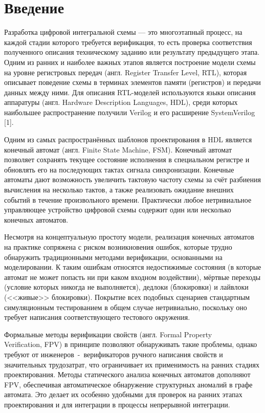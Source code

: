 \section{Введение}
\label{sec:Chapter0} 


Разработка цифровой интегральной схемы --- это многоэтапный процесс, на каждой стадии
которого требуется верификация, то есть проверка соответствия полученного описания техническому
заданию или результату предыдущего этапа. Одним из ранних и наиболее важных этапов является
построение модели схемы на уровне регистровых передач (англ. Register Transfer Level, RTL),
которая описывает поведение схемы в терминах элементов памяти (регистров) и передачи данных между ними.
Для описания RTL-моделей используются языки описания аппаратуры
(англ. Hardware Description Languages, HDL), среди которых наибольшее распространение
получили Verilog и его расширение SystemVerilog [1].

Одним из самых распространённых шаблонов проектирования в HDL является конечный автомат
(англ. Finite State Machine, FSM). Конечный автомат позволяет сохранять текущее состояние
исполнения в специальном регистре и обновлять его на последующих тактах сигнала синхронизации.
Конечные автоматы дают возможность увеличить тактовую частоту схемы за счёт разбиения
вычисления на несколько тактов, а также реализовать ожидание внешних событий в течение
произвольного времени. Практически любое нетривиальное управляющее устройство цифровой схемы
содержит один или несколько конечных автоматов.

Несмотря на концептуальную простоту модели, реализация конечных автоматов на практике
сопряжена с риском возникновения ошибок, которые трудно обнаружить традиционными методами
верификации, основанными на моделировании. К таким ошибкам относятся недостижимые состояния
(в которые автомат не может попасть ни при каком входном воздействии),
мёртвые переходы (условие которых никогда не выполняется), дедлоки (блокировки) и лайвлоки 
(<<живые>> блокировки). Покрытие всех подобных сценариев стандартным симуляционным тестированием
в общем случае нетривиально, поскольку оно требует написания соответствующего тестового окружения.

Формальные методы верификации свойств (англ. Formal Property \\ Verification, FPV)
в принципе позволяют обнаруживать такие проблемы, однако требуют от инженеров~-~верификаторов
ручного написания свойств и значительных трудозатрат, что ограничивает их применимость
на ранних стадиях проектирования. Методы статического анализа конечных автоматов
дополняют FPV, обеспечивая автоматическое обнаружение структурных аномалий в графе автомата.
Это делает их особенно удобными для проверок на ранних этапах проектирования и для
интеграции в процессы непрерывной интеграции.

